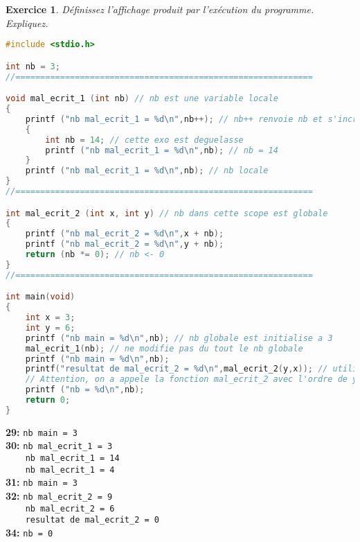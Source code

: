 \documentclass[a4paper]{article}
\newtheorem{exercice}{Exercice}
\theoremstyle{definition}
\begin{document}
\begin{exercice}
    D\'efinissez l'affichage produit par l'ex\'ecution du programme. Expliquez.
\end{exercice}
\begin{lstlisting}[language=C]
#include <stdio.h>

int nb = 3;
//============================================================

void mal_ecrit_1 (int nb) // nb est une variable locale
{
    printf ("nb mal_ecrit_1 = %d\n",nb++); // nb++ renvoie nb et s'incremente APRES
    {
        int nb = 14; // cette exo est deguelasse
        printf ("nb mal_ecrit_1 = %d\n",nb); // nb = 14
    }
    printf ("nb mal_ecrit_1 = %d\n",nb); // nb locale
}
//============================================================

int mal_ecrit_2 (int x, int y) // nb dans cette scope est globale
{
    printf ("nb mal_ecrit_2 = %d\n",x + nb);
    printf ("nb mal_ecrit_2 = %d\n",y + nb);
    return (nb *= 0); // nb <- 0
}
//============================================================

int main(void)
{
    int x = 3;
    int y = 6;
    printf ("nb main = %d\n",nb); // nb globale est initialise a 3
    mal_ecrit_1(nb); // ne modifie pas du tout le nb globale
    printf ("nb main = %d\n",nb);
    printf("resultat de mal_ecrit_2 = %d\n",mal_ecrit_2(y,x)); // utilise nb = 3, renvoie nb <- 0
    // Attention, on a appele la fonction mal_ecrit_2 avec l'ordre de y et x inverse
    printf ("nb = %d\n",nb);
    return 0;
}
\end{lstlisting}

\noindent \textbf{29:} \verb|nb main = 3|\\
\textbf{30:} \verb|nb mal_ecrit_1 = 3|\\
\verb|    nb mal_ecrit_1 = 14| \\
\verb|    nb mal_ecrit_1 = 4| \\
\textbf{31:} \verb|nb main = 3| \\
\textbf{32:} \verb|nb mal_ecrit_2 = 9| \\
\verb|    nb mal_ecrit_2 = 6|\\
\verb|    resultat de mal_ecrit_2 = 0|\\
\textbf{34:} \verb|nb = 0|
\end{document}
